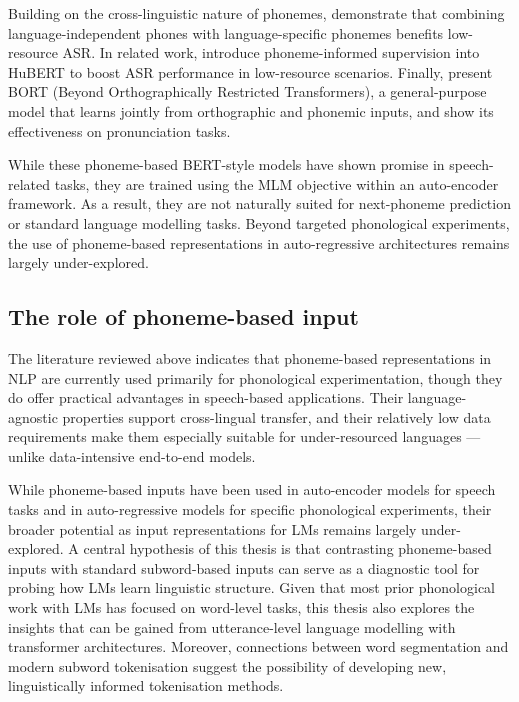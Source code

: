 Building on the cross-linguistic nature of phonemes, \citet{li2020universal} demonstrate that combining language-independent phones with language-specific phonemes benefits low-resource ASR. In related work, \citet{feng-2023-language-universal-phonetic} introduce phoneme-informed supervision into HuBERT to boost ASR performance in low-resource scenarios. Finally, \citet{gale-etal-2023-bort} present BORT (Beyond Orthographically Restricted Transformers), a general-purpose model that learns jointly from orthographic and phonemic inputs, and show its effectiveness on pronunciation tasks.


While these phoneme-based BERT-style models have shown promise in speech-related tasks, they are trained using the MLM objective within an auto-encoder framework. As a result, they are not naturally suited for next-phoneme prediction or standard language modelling tasks. Beyond targeted phonological experiments, the use of phoneme-based representations in auto-regressive architectures remains largely under-explored.

\subsection{The role of phoneme-based input}\label{sec:12-phoneval}

The literature reviewed above indicates that phoneme-based representations in NLP are currently used primarily for phonological experimentation, though they do offer practical advantages in speech-based applications. Their language-agnostic properties support cross-lingual transfer, and their relatively low data requirements make them especially suitable for under-resourced languages --- unlike data-intensive end-to-end models.

While phoneme-based inputs have been used in auto-encoder models for speech tasks and in auto-regressive models for specific phonological experiments, their broader potential as input representations for LMs remains largely under-explored. A central hypothesis of this thesis is that contrasting phoneme-based inputs with standard subword-based inputs can serve as a diagnostic tool for probing how LMs learn linguistic structure. Given that most prior phonological work with LMs has focused on word-level tasks, this thesis also explores the insights that can be gained from utterance-level language modelling with transformer architectures. Moreover, connections between word segmentation and modern subword tokenisation suggest the possibility of developing new, linguistically informed tokenisation methods.

